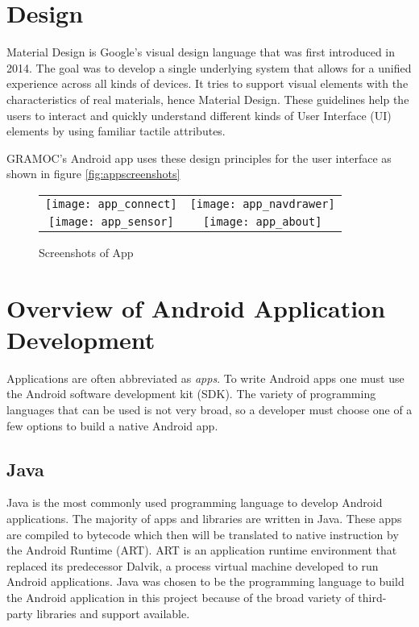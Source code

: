 \section{Design}
Material Design is Google's visual design language that was first introduced in 2014. The goal was to develop a single underlying system that allows for a unified experience across all kinds of devices. It tries to support visual elements with the characteristics of real materials, hence Material Design. These guidelines help the users to interact and quickly understand different kinds of User Interface (UI) elements by using familiar tactile attributes.

GRAMOC's Android app uses these design principles for the user interface as shown in figure \vref{fig:appscreenshots}

\begin{figure}[H]
    \centering
    \begin{tabular}{cc}
    \texttt{[image: app\_connect]}
    &
    \texttt{[image: app\_navdrawer]}
    \\
    \texttt{[image: app\_sensor]}
    &
    \texttt{[image: app\_about]}
    \end{tabular}
    \caption{Screenshots of App}
    \label{fig:appscreenshots}
\end{figure}

\section{Overview of Android Application Development}
Applications are often abbreviated as \textit{apps}. To write Android apps one must use the Android software development kit (SDK). The variety of programming languages that can be used is not very broad, so a developer must choose one of a few options to build a native Android app.

\subsection{Java}
Java is the most commonly used programming language to develop Android applications. The majority of apps and libraries are written in Java. These apps are compiled to bytecode which then will be translated to native instruction by the Android Runtime (ART). ART is an application runtime environment that replaced its predecessor Dalvik, a process virtual machine developed to run Android applications. Java was chosen to be the programming language to build the Android application in this project because of the broad variety of third-party libraries and support available.


